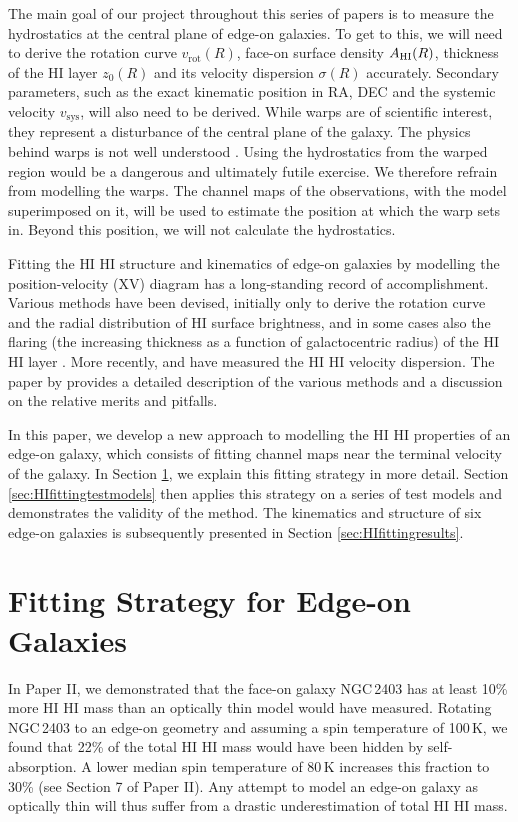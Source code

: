 \documentclass[useAMS,usenatbib]{mn2e}
\newcommand{\hi}{%
  \relax
  \ifmmode
    \textrm{\textsc{HI}}
  \else
    \textsc{H{\smaller}I}
  \fi
}
\begin{document}
The main goal of our project throughout this series of papers is to 
measure the hydrostatics at the central plane of edge-on galaxies.
To get to this, we will need to  derive the rotation curve $v_\textrm{rot}(R)$, 
face-on surface density $A_\hi(R)$, thickness of the HI layer $z_0(R)$ and 
its velocity 
dispersion $\sigma(R)$ accurately.
Secondary parameters, such as the exact kinematic position in RA, DEC and the 
systemic velocity $v_\textrm{sys}$, will also need to be derived.
While warps are of scientific interest, they represent a disturbance of the 
central plane of the galaxy. 
The physics behind warps is not well understood \citep{kf11}.
Using the hydrostatics from the warped region would be a dangerous and 
ultimately futile exercise. 
We therefore refrain from modelling the warps. 
The channel maps of the observations, with the model superimposed on it, 
will be used to estimate the position at which the warp sets in.
Beyond this position, we will not calculate the hydrostatics.

Fitting the \hi structure and kinematics of edge-on galaxies by modelling the 
position-velocity (XV) diagram has a long-standing record of accomplishment.
Various methods have been devised, initially only to derive the rotation curve 
and the
radial distribution of HI surface brightness, and in some cases also the 
flaring (the increasing
thickness as a function of galactocentric radius) of the \hi layer  
\citep[e.g.][and references therein]{Sancisi1979A, vdk81c,   
Garcia-Ruiz2002A, Takamiya2002A, 
Uson2003A, kk04, Kregel2004B}.
More recently, \citet{Olling1996A, Olling1996B} and 
\citet{OBrien2010A,OBrien2010B,OBrien2010C,OBrien2010D} have  measured the 
\hi velocity dispersion. 
The paper by \citet{OBrien2010B} provides a detailed description of the 
various methods and a discussion on the relative merits and pitfalls.

In this paper, we develop a new approach to modelling the \hi properties 
of an edge-on galaxy, which consists of fitting channel maps near the terminal 
velocity of the galaxy.
In Section \ref{sec:HIfittingstrategy}, we explain this fitting strategy in 
more detail.
Section \ref{sec:HIfittingtestmodels} then applies this strategy on a series 
of test models and demonstrates the validity of the method.
The kinematics and structure of six edge-on galaxies is subsequently presented 
in Section \ref{sec:HIfittingresults}.

\section{Fitting Strategy for Edge-on Galaxies}\label{sec:HIfittingstrategy}
In Paper II, we demonstrated that the face-on galaxy NGC\,2403 has at least 10\% 
more \hi mass than an optically thin model would have measured.
Rotating NGC\,2403 to an edge-on geometry and assuming
a spin temperature of 100\,K, 
we found that 22\% of the total \hi mass would have been hidden by 
self-absorption. 
A lower median spin temperature of 80\,K increases this fraction to 30\% 
(see Section 7 of Paper II).
Any attempt to model an edge-on galaxy as optically thin will thus suffer 
from a drastic underestimation of total \hi mass.
\end{document}
